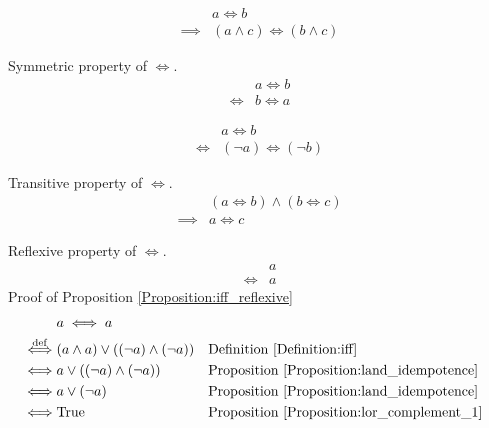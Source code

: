 \begin{prop}
\label{Proposition:iff_land}
\begin{align*}
& a \iff b \\
\implies & (a \land c) \iff (b \land c)
\end{align*}
\end{prop}

\begin{prop}
\label{Proposition:iff_symmetric}
Symmetric property of $\iff$.
\begin{align*}
& a \iff b \\
\iff & b \iff a
\end{align*}
\end{prop}

\begin{prop}
\label{Proposition:iff_contrapositive}
\begin{align*}
& a \iff b \\
\iff & (\lnot a) \iff (\lnot b)
\end{align*}
\end{prop}

\begin{prop}
\label{Proposition:iff_transitive}
Transitive property of $\iff$.
\begin{align*}
& (a \iff b) \land (b \iff c) \\
\implies & a \iff c
\end{align*}
\end{prop}

\begin{prop}
\label{Proposition:iff_reflexive}
Reflexive property of $\iff$.
\begin{align*}
& a \\
\iff & a
\end{align*}
Proof of Proposition \ref{Proposition:iff_reflexive}
\begin{align*}
& a \iff a \\
\overset{\operatorname{def}}{\iff} & (a \land a) \lor ((\lnot a) \land (\lnot a))
&& \text{Definition \ref{Definition:iff}} \\
\iff & a \lor ((\lnot a) \land (\lnot a))
&& \text{Proposition \ref{Proposition:land_idempotence}} \\
\iff & a \lor (\lnot a)
&& \text{Proposition \ref{Proposition:land_idempotence}} \\
\iff & \text{True}
&& \text{Proposition \ref{Proposition:lor_complement_1}} \\
\end{align*}
\end{prop}

